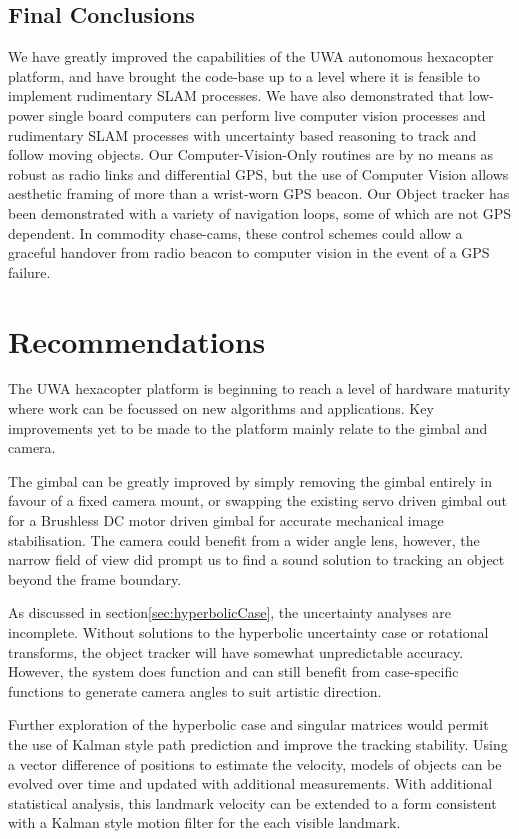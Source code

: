 \documentclass{article}
\begin{document}
  \subsection{Final Conclusions}
    We have greatly improved the capabilities of the UWA autonomous hexacopter platform, and have brought the code-base up to a level where it is feasible to implement rudimentary SLAM processes.
    We have also demonstrated that low-power single board computers can perform live computer vision processes and rudimentary SLAM processes with uncertainty based reasoning to track and follow moving objects.
    Our Computer-Vision-Only routines are by no means as robust as radio links and differential GPS, but the use of Computer Vision allows aesthetic framing of more than a wrist-worn GPS beacon.
    Our Object tracker has been demonstrated with a variety of navigation loops, some of which are not GPS dependent.  In commodity chase-cams, these control schemes could allow a graceful handover from radio beacon to computer vision in the event of a GPS failure.



\section{Recommendations}

  The UWA hexacopter platform is beginning to reach a level of hardware maturity where work can be focussed on new algorithms and applications.  Key improvements yet to be made to the platform mainly relate to the gimbal and camera.

  The gimbal can be greatly improved by simply removing the gimbal entirely in favour of a fixed camera mount, or swapping the existing servo driven gimbal out for a Brushless DC motor driven gimbal for accurate mechanical image stabilisation.  The camera could benefit from a wider angle lens, however, the narrow field of view did prompt us to find a sound solution to tracking an object beyond the frame boundary.

  As discussed in section\ref{sec:hyperbolicCase}, the uncertainty analyses are incomplete.
  Without solutions to the hyperbolic uncertainty case or rotational transforms, the object tracker will have somewhat unpredictable accuracy.  However, the system does function and can still benefit from case-specific functions to generate camera angles to suit artistic direction.

  Further exploration of the hyperbolic case and singular matrices would permit the use of Kalman style path prediction and improve the tracking stability.
  Using a vector difference of positions to estimate the velocity, models of objects can be evolved over time and updated with additional measurements.  With additional statistical analysis, this landmark velocity can be extended to a form consistent with a Kalman style motion filter for the each visible landmark.
\end{document}
